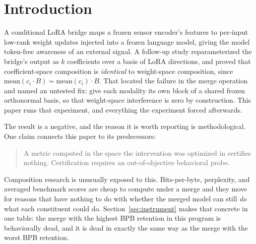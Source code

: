 \documentclass[11pt]{article}
\begin{document}
\section{Introduction}
A conditional LoRA bridge \cite{penov2026bridges} maps a frozen sensor encoder's features to per-input low-rank weight updates injected into a frozen language model, giving the model token-free awareness of an external signal. A follow-up study \cite{penov2026basis} reparameterized the bridge's output as $k$ coefficients over a basis of LoRA directions, and proved that coefficient-space composition is \emph{identical} to weight-space composition, since $\mathrm{mean}(c_i \cdot B) = \mathrm{mean}(c_i) \cdot B$. That located the failure in the merge operation and named an untested fix: give each modality its own block of a shared frozen orthonormal basis, so that weight-space interference is zero by construction. This paper runs that experiment, and everything the experiment forced afterwards.

The result is a negative, and the reason it is worth reporting is methodological. One claim connects this paper to its predecessors:

\begin{quote}
A metric computed in the space the intervention was optimized in certifies nothing. Certification requires an out-of-objective behavioral probe.
\end{quote}

Composition research is unusually exposed to this. Bits-per-byte, perplexity, and averaged benchmark scores are cheap to compute under a merge and they move for reasons that have nothing to do with whether the merged model can still \emph{do} what each constituent could do. Section~\ref{sec:instrument} makes that concrete in one table: the merge with the highest BPB retention in this program is behaviorally dead, and it is dead in exactly the same way as the merge with the worst BPB retention.
\end{document}

